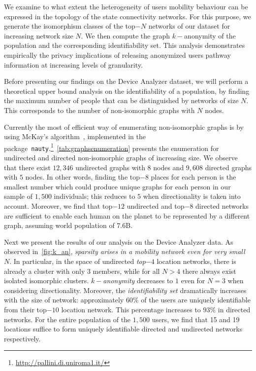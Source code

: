 We examine to what extent the heterogeneity of users mobility behaviour can be expressed in the topology of the state connectivity networks.
For this purpose, we generate the isomorphism classes of the top$-N$ networks of our dataset for increasing network size $ N $.
We then compute the graph $k-$anonymity of the population and the corresponding identifiability set.
This analysis demonstrates empirically the privacy implications of releasing anonymized users pathway information at increasing levels of granularity.

Before presenting our findings on the Device Analyzer dataset, we will perform a theoretical upper bound analysis on the identifiability of a population, by finding the maximum number of people that can be distinguished by networks of size $ N $.
This corresponds to the number of non-isomorphic graphs with $ N $ nodes.

Currently the most of efficient way of enumerating  non-isomorphic graphs is by using McKay's algorithm~\cite{McKay}, implemented in the package~\texttt{nauty}.\footnote{\url{http://pallini.di.uniroma1.it/}}~\cref{tab:graphsenumeration} presents the enumeration for undirected and directed non-isomorphic graphs of increasing size. We observe that there exist $12,346$ undirected graphs with $8$ nodes and $9,608$ directed graphs with $5$ nodes. In other words, finding the top$-8$ places for each person is the smallest number which could produce unique graphs for each person in our sample of $1,500$ individuals; this reduces to $5$ when directionality is taken into account. Moreover, we find that top$-12$ undirected and top$-8$ directed networks are sufficient to enable each human on the planet to be represented by a different graph, assuming world population of $7.6$B.

Next we present the results of our analysis on the Device Analyzer data.
As observed in~\cref{fig:k_an}, \emph{sparsity arises in a mobility network even for very small $ N $}.
In particular, in the space of undirected \emph{top$-4$} location networks, there is already a cluster with only $ 3 $ members, while for all $ N > 4 $ there always exist isolated isomorphic clusters.
\emph{$ k-$anonymity} decreases to $ 1 $ even for $ N=3 $ when considering directionality.
Moreover, the \emph{identifiability set} dramatically increases with the size of network: approximately $ 60\% $ of the users are uniquely identifiable from their top$-10$ location network.
This percentage increases to $93\%$ in directed networks.
For the entire population of the $ 1,500 $ users, we find that 15 and 19 locations suffice to form uniquely identifiable directed and undirected networks respectively.


